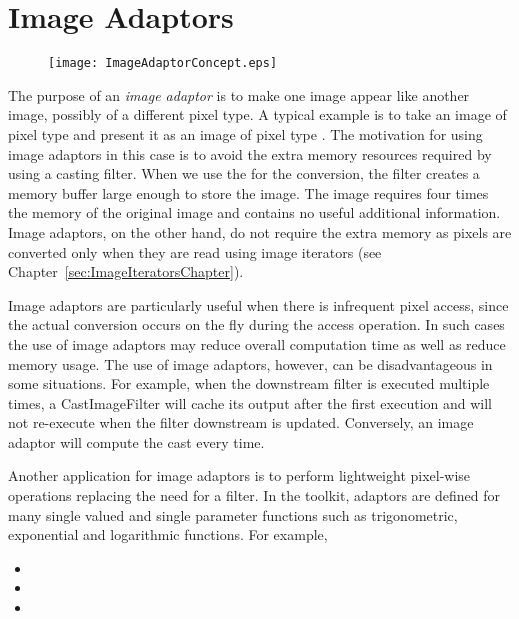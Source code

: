 
\chapter{Image Adaptors}
\label{sec:ImageAdaptors}


\begin{figure}
\center
\texttt{[image: ImageAdaptorConcept.eps]}
\label{fig:ImageAdaptorConcept}
\end{figure}

The purpose of an \emph{image adaptor} is to make one image appear
like another image, possibly of a different pixel type.  A typical
example is to take an image of pixel type  and
present it as an image of pixel type . The motivation for
using image adaptors in this case is to avoid the extra memory
resources required by using a casting filter.  When we use the
 for the conversion, the filter creates a
memory buffer large enough to store the  image. The
 image requires four times the memory of the
original image and contains no useful additional information. Image
adaptors, on the other hand, do not require the extra memory as
pixels are converted only when they are read using image iterators
(see Chapter~\ref{sec:ImageIteratorsChapter}).

Image adaptors are particularly useful when there is infrequent pixel access,
since the actual conversion occurs on the fly during the access operation. In
such cases the use of image adaptors may reduce overall computation time as
well as reduce memory usage. The use of image adaptors, however, can be
disadvantageous in some situations. For example, when the downstream filter
is executed multiple times, a CastImageFilter will cache its output after the
first execution and will not re-execute when the filter downstream is
updated. Conversely, an image adaptor will compute the cast every time.

Another application for image adaptors is to perform lightweight
pixel-wise operations replacing the need for a filter. In the toolkit,
adaptors are defined for many single valued and single parameter
functions such as trigonometric, exponential and logarithmic
functions. For example,
\begin{itemize}
\item {}
\item {}
\item {}
\end{itemize}

